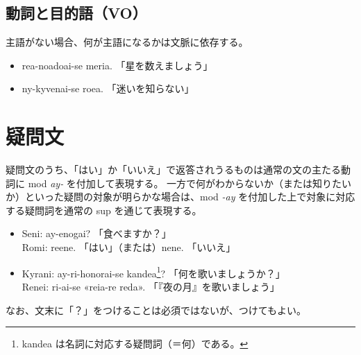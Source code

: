 \subsection{動詞と目的語（VO）}
主語がない場合、何が主語になるかは文脈に依存する。

\begin{itemize}
    \item rea-noadoai-se meria. 「星を数えましょう」
    \item ny-kyvenai-se roea. 「迷いを知らない」
\end{itemize}

\clearpage

\section{疑問文}

疑問文のうち、「はい」か「いいえ」で返答されうるものは通常の文の主たる動詞に mod \emph{ay-} を付加して表現する。
一方で何がわからないか（または知りたいか）といった疑問の対象が明らかな場合は、mod \emph{-ay} を付加した上で対象に対応する疑問詞を通常の sup を通じて表現する。

\begin{itemize}
    \item Seni: ay-enogai? 「食べますか？」 \\ Romi: reene. 「はい」（または）nene. 「いいえ」
    \item Kyrani: ay-ri-honorai-se kandea\footnote{kandea は名詞に対応する疑問詞（＝何）である。}? 「何を歌いましょうか？」\\ Renei: ri-ai-se «reia-re reda». 「『夜の月』を歌いましょう」
\end{itemize}

なお、文末に「？」をつけることは必須ではないが、つけてもよい。
